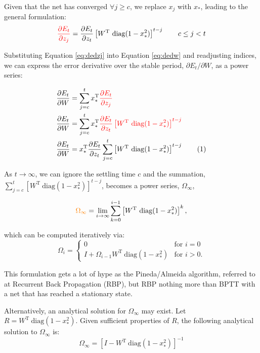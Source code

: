 \documentclass[11pt,letterpaper]{article}
\newcommand{\T}{{\ensuremath{\mathrm{T}}}}
\newcommand{\diag}{{\ensuremath{\mathrm{diag}}}}
\theoremstyle{definition}
\newcommand{\highlight}[2]{\textcolor{#1}{#2}}
\newcommand\numberthis{\addtocounter{equation}{1}\tag{\theequation}}
\begin{document}
Given that the net has converged $\forall j \ge c$, we replace $x_j$ with $x_*$, leading to the general formulation:
\begin{equation}
\highlight{red}{\frac{\partial E_t}{\partial z_j}} = 
\frac{\partial E_t}{\partial z_t}  \left[ W^{\T} ~\diag (1-x_*^2) \right]^{t-j}    \qquad c \le j < t
\label{eq:dedzj}
\end{equation}

Substituting Equation \ref{eq:dedzj} into Equation \ref{eq:dedw} and readjusting indices, we can express the error derivative over
the stable period, $\partial E_t / \partial W$, as a power series:

\begin{align*}
\frac{\partial E_t}{\partial W} &= \sum_{j=c}^t  x_*^{\T}  \highlight{red}{\frac{\partial E_t}{\partial z_j}} \\
\frac{\partial E_t}{\partial W} &= \sum_{j=c}^t  x_*^{\T}  \highlight{red}{\frac{\partial E_t}{\partial z_t}  \left[ W^{\T} ~\diag (1-x_*^2) \right]^{t-j}} \\
\frac{\partial E_t}{\partial W} &= x_*^{\T} \frac{\partial E_t}{\partial z_t}  \sum_{j=c}^t  \left[ W^{\T} ~\diag(1-x_*^2) \right] ^{t-j} \numberthis 
\label{eq:dedw_penultimate}
\end{align*}

As $t \rightarrow \infty$, we can ignore the settling time $c$ and the summation, $\sum_{j=c}^t  \left[ W^{\T} ~\diag(1-x_*^2) \right] ^{t-j}$,  becomes a power series, $\Omega_\infty$,

\begin{equation}
\highlight{orange}{\Omega_{\infty}} = \lim_{i \rightarrow \infty} \sum_{k=0}^{i-1}\left[W^{\T} ~\diag(1-x_*^2) \right]^k,
\label{eq:power}
\end{equation}

which can be computed iteratively via:
\begin{equation}
\Omega_i = 
\begin{cases}
0 & \text{for } i = 0\\
I + \Omega_{i-1}W^{\T} ~\diag(1-x_*^2)  & \text{for } i > 0.
\end{cases}
\label{eq:power_iter}
\end{equation}

This formulation gets a lot of hype as the Pineda/Almeida algorithm, referred to at Recurrent Back Propagation (RBP), but RBP nothing more than BPTT with a net that has reached a stationary state.

Alternatively, an analytical solution for $\Omega_\infty$ may exist. Let $R = W^{\T} ~\diag(1-x_*^2)$. Given sufficient properties of $R$, the following analytical solution to $\Omega_\infty$ is:
\begin{equation}
\Omega_\infty = \left[I -  W^{\T} ~\diag(1-x_*^2) \right]^{-1}
\label{eq:geo_series_converge}
\end{equation}
\end{document}
